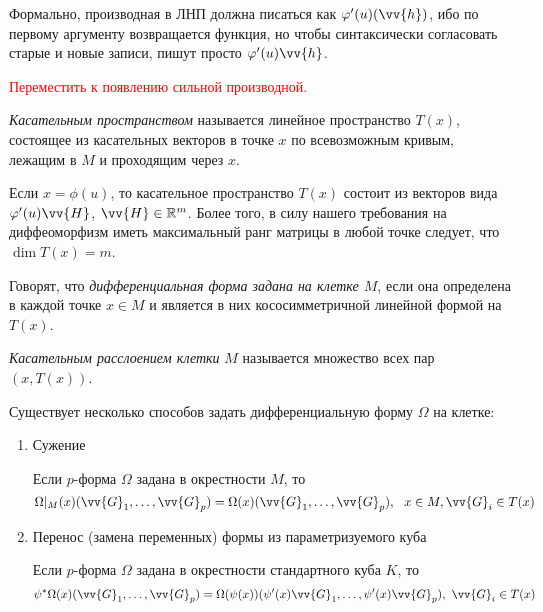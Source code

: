 \begin{reminder}
	Формально, производная в ЛНП должна писаться как $\phi'(u)(\vv{h})$, ибо по первому аргументу возвращается функция, но чтобы синтаксически согласовать старые и новые записи, пишут просто $\phi'(u)\vv{h}$.
	
	\textcolor{red}{Переместить к появлению сильной производной.}
\end{reminder}

\begin{definition}
	\textit{Касательным пространством} называется линейное пространство $T(x)$, состоящее из касательных векторов в точке $x$ по всевозможным кривым, лежащим в $M$ и проходящим через $x$.
\end{definition}

\begin{note}
	Если $x = \phi(u)$, то касательное пространство $T(x)$ состоит из векторов вида $\phi'(u)\vv{H}$, $\vv{H} \in \R^m$. Более того, в силу нашего требования на диффеоморфизм иметь максимальный ранг матрицы в любой точке следует, что $\dim T(x) = m$.
\end{note}

\begin{definition}
	Говорят, что \textit{дифференциальная форма задана на клетке $M$}, если она определена в каждой точке $x \in M$ и является в них кососимметричной линейной формой на $T(x)$.
\end{definition}

\begin{definition}
	\textit{Касательным расслоением клетки} $M$ называется множество всех пар $(x, T(x))$.
\end{definition}

\begin{note}
	Существует несколько способов задать дифференциальную форму $\Omega$ на клетке:
	\begin{enumerate}
		\item Сужение
		
		Если $p$-форма $\Omega$ задана в окрестности $M$, то
		\[
			\Omega|_M(x)(\vv{G}_1, \ldots, \vv{G}_p) = \Omega(x)(\vv{G}_1, \ldots, \vv{G}_p),\ \ x \in M, \vv{G}_i \in T(x)
		\]
		
		\item Перенос (замена переменных) формы из параметризуемого куба
		
		Если $p$-форма $\Omega$ задана в окрестности стандартного куба $K$, то
		\[
			\psi^*\Omega(x)(\vv{G}_1, \ldots, \vv{G}_p) = \Omega(\psi(x))(\psi'(x)\vv{G}_1, \ldots, \psi'(x)\vv{G}_p),\ \vv{G}_i \in T(x)
		\]
	\end{enumerate}
\end{note}

